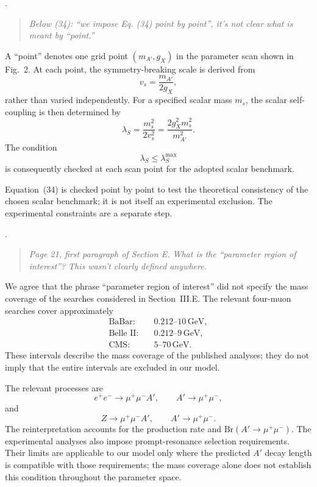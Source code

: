 \documentclass[12pt,a4paper]{article}
\begin{document}
\medskip
{}. \begin{quote}\itshape
Below (34): ``we impose Eq. (34) point by point'', it's not clear what is meant by ``point.''
\end{quote}

A ``point'' denotes one grid point \((m_{A'},g_X)\) in the parameter scan shown in Fig.~2. At each point, the symmetry-breaking scale is derived from
\[
v_s=\frac{m_{A'}}{2g_X},
\]
rather than varied independently. For a specified scalar mass \(m_s\), the scalar self-coupling is then determined by
\[
\lambda_S
=\frac{m_s^2}{2v_s^2}
=\frac{2g_X^2m_s^2}{m_{A'}^2}.
\]
The condition
\[
\lambda_S\leq\lambda_S^{\max}
\]
is consequently checked at each scan point for the adopted scalar benchmark.

Equation~(34) is checked point by point to test the theoretical consistency of the chosen scalar benchmark; it is not itself an experimental exclusion. The experimental constraints are a separate step.

\medskip
{}. \begin{quote}\itshape
Page 21, first paragraph of Section E. What is the ``parameter region of interest''? This wasn't clearly defined anywhere.
\end{quote}

We agree that the phrase ``parameter region of interest'' did not specify the mass coverage of the searches considered in Section~III.E. The relevant four-muon searches cover approximately
\[
\begin{aligned}
\text{BaBar}:&\quad 0.212\text{--}10\,\mathrm{GeV},\\
\text{Belle II}:&\quad 0.212\text{--}9\,\mathrm{GeV},\\
\text{CMS}:&\quad 5\text{--}70\,\mathrm{GeV}.
\end{aligned}
\]
These intervals describe the mass coverage of the published analyses; they do not imply that the entire intervals are excluded in our model.

The relevant processes are
\[
e^+e^-\to\mu^+\mu^-A',
\qquad A'\to\mu^+\mu^-,
\]
and
\[
Z\to\mu^+\mu^-A',
\qquad A'\to\mu^+\mu^-.
\]
The reinterpretation accounts for the production rate and \(\mathrm{Br}(A'\to\mu^+\mu^-)\). The experimental analyses also impose prompt-resonance selection requirements. Their limits are applicable to our model only where the predicted \(A'\) decay length is compatible with those requirements; the mass coverage alone does not establish this condition throughout the parameter space.
\end{document}

